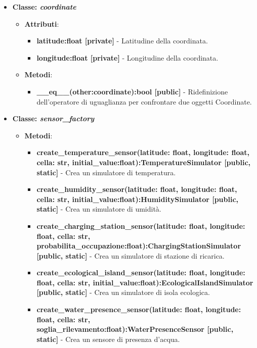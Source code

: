 \begin{itemize}
\begin{itemize}
\begin{itemize}
    \end{itemize}
\end{itemize}
    \item{\textbf{Classe: \textit{coordinate}}}
    \begin{itemize}
        \item    \textbf{Attributi}: 
    \begin{itemize}
        \item \textbf{latitude:float [private]} - Latitudine della coordinata.
        \item \textbf{longitude:float [private]} - Longitudine della coordinata.
    \end{itemize}
    \item     \textbf{Metodi}: 
    \begin{itemize}
        \item \textbf{\_\_eq\_\_(other:coordinate):bool [public]} - Ridefinizione dell'operatore di uguaglianza per confrontare due oggetti Coordinate.
    \end{itemize}
\end{itemize}
    \item{\textbf{Classe: \textit{sensor\_factory}}}
    \begin{itemize}
        \item    \textbf{Metodi}: 
\begin{itemize}
    \item \textbf{create\_temperature\_sensor(latitude: float, longitude: float, cella: str, initial\_value:float):TemperatureSimulator [public, static]} - Crea un simulatore di temperatura.
    \item \textbf{create\_humidity\_sensor(latitude: float, longitude: float, cella: str, initial\_value:float):HumiditySimulator [public, static]} - Crea un simulatore di umidità.
    \item \textbf{create\_charging\_station\_sensor(latitude: float, longitude: float, cella: str, probabilita\_occupazione:float):ChargingStationSimulator [public, static]} - Crea un simulatore di stazione di ricarica.
    \item \textbf{create\_ecological\_island\_sensor(latitude: float, longitude: float, cella: str, initial\_value:float):EcologicalIslandSimulator [public, static]} - Crea un simulatore di isola ecologica.
    \item \textbf{create\_water\_presence\_sensor(latitude: float, longitude: float, cella: str, soglia\_rilevamento:float):WaterPresenceSensor [public, static]} - Crea un sensore di presenza d'acqua.

\end{itemize}
\end{itemize}
\end{itemize}
